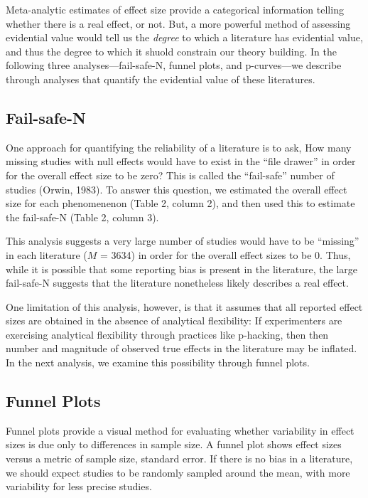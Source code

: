 \documentclass[american,floatsintext,man]{apa6}
\begin{document}
Meta-analytic estimates of effect size provide a categorical information
telling whether there is a real effect, or not. But, a more powerful
method of assessing evidential value would tell us the \emph{degree} to
which a literature has evidential value, and thus the degree to which it
shuold constrain our theory building. In the following three
analyses---fail-safe-N, funnel plots, and p-curves---we describe through
analyses that quantify the evidential value of these literatures.

\subsection{Fail-safe-N}\label{fail-safe-n}

One approach for quantifying the reliability of a literature is to ask,
How many missing studies with null effects would have to exist in the
\enquote{file drawer} in order for the overall effect size to be zero?
This is called the \enquote{fail-safe} number of studies (Orwin, 1983).
To answer this question, we estimated the overall effect size for each
phenomenenon (Table 2, column 2), and then used this to estimate the
fail-safe-N (Table 2, column 3).

This analysis suggests a very large number of studies would have to be
\enquote{missing} in each literature (\(M\) = 3634) in order for the
overall effect sizes to be 0. Thus, while it is possible that some
reporting bias is present in the literature, the large fail-safe-N
suggests that the literature nonetheless likely describes a real effect.

One limitation of this analysis, however, is that it assumes that all
reported effect sizes are obtained in the absence of analytical
flexibility: If experimenters are exercising analytical flexibility
through practices like p-hacking, then then number and magnitude of
observed true effects in the literature may be inflated. In the next
analysis, we examine this possibility through funnel plots.

\subsection{Funnel Plots}\label{funnel-plots}

Funnel plots provide a visual method for evaluating whether variability
in effect sizes is due only to differences in sample size. A funnel plot
shows effect sizes versus a metric of sample size, standard error. If
there is no bias in a literature, we should expect studies to be
randomly sampled around the mean, with more variability for less precise
studies.
\end{document}

